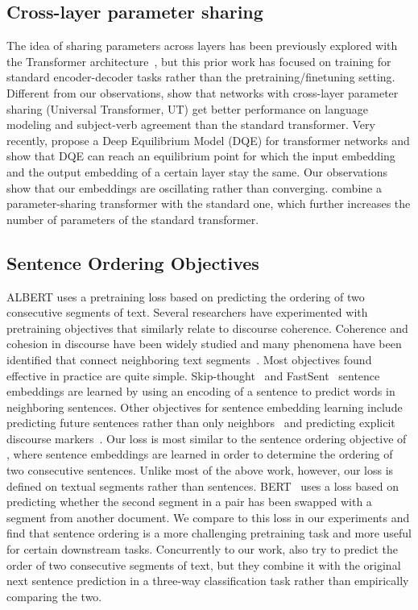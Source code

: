 \subsection{Cross-layer parameter sharing}
The idea of sharing parameters across layers 
has been previously explored with the Transformer architecture~\citep{vaswani2017attention}, but this prior work has focused on training for standard encoder-decoder tasks rather than the pretraining/finetuning setting. Different from our observations, \cite{dehghani2018universal} show that  networks with cross-layer parameter sharing (Universal Transformer, UT) get better performance on language modeling and subject-verb agreement than the standard transformer. Very recently, \cite{bai2019deep} propose a Deep Equilibrium Model (DQE) for transformer networks and show that DQE can reach an equilibrium point for which the input embedding and the output embedding of a certain layer stay the same. Our observations show that our embeddings are oscillating rather than converging. \cite{Hao_2019} combine a parameter-sharing transformer with the standard one, which further increases the number of parameters of the standard transformer.  

\vspace{-5pt}
\subsection{Sentence Ordering Objectives}
ALBERT uses a pretraining loss based on predicting the ordering of two consecutive segments of text. Several researchers have experimented with pretraining objectives that similarly relate to discourse coherence. 
Coherence and cohesion in discourse have been widely studied and many phenomena have been identified that connect neighboring text segments~\citep{DBLP:journals/cogsci/Hobbs79,halliday-76,grosz-etal-1995-centering}. 
Most objectives found effective in practice are quite simple. 
Skip-thought~\citep{Kiros2015skipthought} and FastSent~\citep{hill2016fastsent} sentence embeddings are learned by using an encoding of a sentence to predict words in neighboring sentences. 
Other objectives for sentence embedding learning include predicting future sentences rather than only neighbors~\citep{gan-etal-2017-learning} and predicting explicit discourse markers~\citep{jernite2017discourse,nie-etal-2019-dissent}. 
Our loss is most similar to the sentence ordering objective of \citet{jernite2017discourse}, where sentence embeddings are learned in order to determine the ordering of two consecutive sentences. 
Unlike most of the above work, however, our loss is defined on textual segments rather than sentences. BERT~\citep{devlin2018bert} uses a loss based on predicting whether the second segment in a pair has been swapped with a segment from another document.
We compare to this loss in our experiments and find that sentence ordering is a more challenging pretraining task and more useful for certain downstream tasks.
Concurrently to our work, \cite{wang2019structbert} also try to predict the order of two consecutive segments of text, but they combine it with the original next sentence prediction in a three-way classification task rather than empirically comparing the two. 
